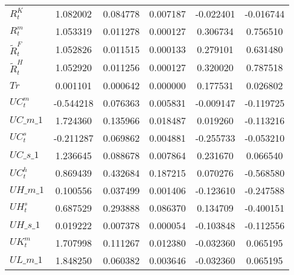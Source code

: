 \begin{center}
\begin{longtable}{lccccc}
$  R^K_t                    $	 & 	        1.082002	 & 	        0.084778	 & 	        0.007187	 & 	       -0.022401	 & 	       -0.016744 \\ 
$  R^m_t                    $	 & 	        1.053319	 & 	        0.011278	 & 	        0.000127	 & 	        0.306734	 & 	        0.756510 \\ 
$  \tilde{R}^F_t            $	 & 	        1.052826	 & 	        0.011515	 & 	        0.000133	 & 	        0.279101	 & 	        0.631480 \\ 
$  \tilde{R}^H_t            $	 & 	        1.052920	 & 	        0.011256	 & 	        0.000127	 & 	        0.320020	 & 	        0.787518 \\ 
$ Tr                        $	 & 	        0.001101	 & 	        0.000642	 & 	        0.000000	 & 	        0.177531	 & 	        0.026802 \\ 
$ UC^m_t                    $	 & 	       -0.544218	 & 	        0.076363	 & 	        0.005831	 & 	       -0.009147	 & 	       -0.119725 \\ 
$UC\_m\_1                   $	 & 	        1.724360	 & 	        0.135966	 & 	        0.018487	 & 	        0.019260	 & 	       -0.113216 \\ 
$ UC^s_t                    $	 & 	       -0.211287	 & 	        0.069862	 & 	        0.004881	 & 	       -0.255733	 & 	       -0.053210 \\ 
$UC\_s\_1                   $	 & 	        1.236645	 & 	        0.088678	 & 	        0.007864	 & 	        0.231670	 & 	        0.066540 \\ 
$ UC^h_t                    $	 & 	        0.869439	 & 	        0.432684	 & 	        0.187215	 & 	        0.070276	 & 	       -0.568580 \\ 
$UH\_m\_1                   $	 & 	        0.100556	 & 	        0.037499	 & 	        0.001406	 & 	       -0.123610	 & 	       -0.247588 \\ 
$  UH^s_t                   $	 & 	        0.687529	 & 	        0.293888	 & 	        0.086370	 & 	        0.134709	 & 	       -0.400151 \\ 
$UH\_s\_1                   $	 & 	        0.019222	 & 	        0.007378	 & 	        0.000054	 & 	       -0.103848	 & 	       -0.112556 \\ 
$  UK^m_t                   $	 & 	        1.707998	 & 	        0.111267	 & 	        0.012380	 & 	       -0.032360	 & 	        0.065195 \\ 
$UL\_m\_1                   $	 & 	        1.848250	 & 	        0.060382	 & 	        0.003646	 & 	       -0.032360	 & 	        0.065195 \\ 

\end{longtable}
\end{center}
